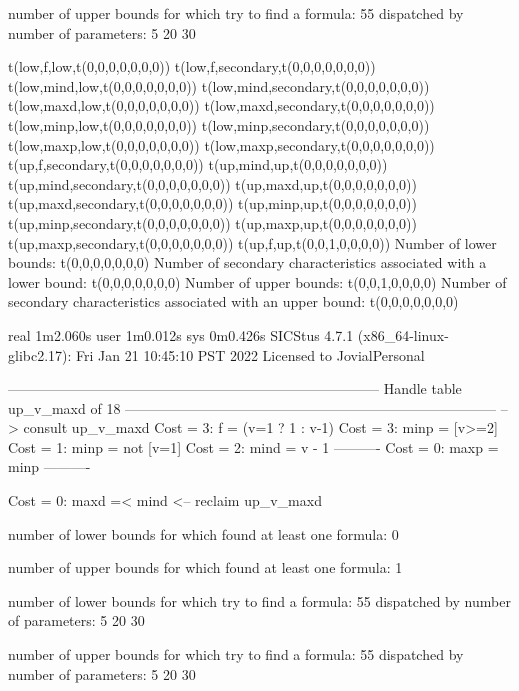 number of upper bounds for which try to find a formula: 55
dispatched by number of parameters: 5  20  30

t(low,f,low,t(0,0,0,0,0,0,0))
t(low,f,secondary,t(0,0,0,0,0,0,0))
t(low,mind,low,t(0,0,0,0,0,0,0))
t(low,mind,secondary,t(0,0,0,0,0,0,0))
t(low,maxd,low,t(0,0,0,0,0,0,0))
t(low,maxd,secondary,t(0,0,0,0,0,0,0))
t(low,minp,low,t(0,0,0,0,0,0,0))
t(low,minp,secondary,t(0,0,0,0,0,0,0))
t(low,maxp,low,t(0,0,0,0,0,0,0))
t(low,maxp,secondary,t(0,0,0,0,0,0,0))
t(up,f,secondary,t(0,0,0,0,0,0,0))
t(up,mind,up,t(0,0,0,0,0,0,0))
t(up,mind,secondary,t(0,0,0,0,0,0,0))
t(up,maxd,up,t(0,0,0,0,0,0,0))
t(up,maxd,secondary,t(0,0,0,0,0,0,0))
t(up,minp,up,t(0,0,0,0,0,0,0))
t(up,minp,secondary,t(0,0,0,0,0,0,0))
t(up,maxp,up,t(0,0,0,0,0,0,0))
t(up,maxp,secondary,t(0,0,0,0,0,0,0))
t(up,f,up,t(0,0,1,0,0,0,0))
Number of lower bounds:                                             t(0,0,0,0,0,0,0)
Number of secondary characteristics associated with a lower bound:  t(0,0,0,0,0,0,0)
Number of upper bounds:                                             t(0,0,1,0,0,0,0)
Number of secondary characteristics associated with an upper bound: t(0,0,0,0,0,0,0)

real	1m2.060s
user	1m0.012s
sys	0m0.426s
SICStus 4.7.1 (x86_64-linux-glibc2.17): Fri Jan 21 10:45:10 PST 2022
Licensed to JovialPersonal


--------------------------------------------------------------------------------
Handle table up_v_maxd of 18
--------------------------------------------------------------------------------
--> consult up_v_maxd
Cost =  3:  f    = (v=1 ? 1 : v-1)
Cost =  3:  minp = [v>=2]
Cost =  1:  minp = not [v=1]
Cost =  2:  mind = v - 1
----------
Cost =  0:  maxp = minp
----------

Cost =  0:  maxd =< mind
<-- reclaim up_v_maxd

number of lower bounds for which found at least one formula: 0

number of upper bounds for which found at least one formula: 1

number of lower bounds for which try to find a formula: 55
dispatched by number of parameters: 5  20  30

number of upper bounds for which try to find a formula: 55
dispatched by number of parameters: 5  20  30

